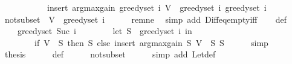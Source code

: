 \begin{isabellebody}
\ \ \ \ \ \ \ \ \ \ \ insert\ {\isacharparenleft}{\kern0pt}argmax{\isacharunderscore}{\kern0pt}gain\ {\isacharparenleft}{\kern0pt}greedy{\isacharunderscore}{\kern0pt}set\ i{\isacharparenright}{\kern0pt}\ {\isacharparenleft}{\kern0pt}V\ {\isacharminus}{\kern0pt}\ greedy{\isacharunderscore}{\kern0pt}set\ i{\isacharparenright}{\kern0pt}{\isacharparenright}{\kern0pt}\ {\isacharparenleft}{\kern0pt}greedy{\isacharunderscore}{\kern0pt}set\ i{\isacharparenright}{\kern0pt}{\isachardoublequoteclose}\isanewline
%
\isadelimproof
%
\endisadelimproof
%
\isatagproof
{}\isamarkupfalse%
\ {\isacharminus}{\kern0pt}\isanewline
\ \ \isamarkupfalse%
\ not{\isacharunderscore}{\kern0pt}subset{\isacharcolon}{\kern0pt}\ {\isachardoublequoteopen}{\isasymnot}\ V\ {\isasymsubseteq}\ greedy{\isacharunderscore}{\kern0pt}set\ i{\isachardoublequoteclose}\isanewline
\ \ \ \ \isamarkupfalse%
\ rem{\isacharunderscore}{\kern0pt}ne\ \isamarkupfalse%
\ {\isacharparenleft}{\kern0pt}simp\ add{\isacharcolon}{\kern0pt}\ Diff{\isacharunderscore}{\kern0pt}eq{\isacharunderscore}{\kern0pt}empty{\isacharunderscore}{\kern0pt}iff{\isacharparenright}{\kern0pt}\isanewline
\isanewline
\ \ \isamarkupfalse%
\ def{\isacharcolon}{\kern0pt}\isanewline
\ \ \ \ {\isachardoublequoteopen}greedy{\isacharunderscore}{\kern0pt}set\ {\isacharparenleft}{\kern0pt}Suc\ i{\isacharparenright}{\kern0pt}\ {\isacharequal}{\kern0pt}\isanewline
\ \ \ \ \ \ \ {\isacharparenleft}{\kern0pt}let\ S\ {\isacharequal}{\kern0pt}\ greedy{\isacharunderscore}{\kern0pt}set\ i\ in\isanewline
\ \ \ \ \ \ \ \ if\ V\ {\isasymsubseteq}\ S\ then\ S\ else\ insert\ {\isacharparenleft}{\kern0pt}argmax{\isacharunderscore}{\kern0pt}gain\ S\ {\isacharparenleft}{\kern0pt}V\ {\isacharminus}{\kern0pt}\ S{\isacharparenright}{\kern0pt}{\isacharparenright}{\kern0pt}\ S{\isacharparenright}{\kern0pt}{\isachardoublequoteclose}\isanewline
\ \ \ \ \isamarkupfalse%
\ simp\isanewline
\isanewline
\ \ \isamarkupfalse%
\ {\isacharquery}{\kern0pt}thesis\isanewline
\ \ \ \ \isamarkupfalse%
\ def\isanewline
\ \ \ \ \isamarkupfalse%
\ not{\isacharunderscore}{\kern0pt}subset\isanewline
\ \ \ \ \isamarkupfalse%
\ {\isacharparenleft}{\kern0pt}simp\ add{\isacharcolon}{\kern0pt}\ Let{\isacharunderscore}{\kern0pt}def{\isacharparenright}{\kern0pt}\isanewline
{}\isamarkupfalse%
%
\endisatagproof
{\isafoldproof}%
%
\isadelimproof
%
\endisadelimproof
%
\begin{isamarkuptext}%

\end{isamarkuptext}
\end{isabellebody}
